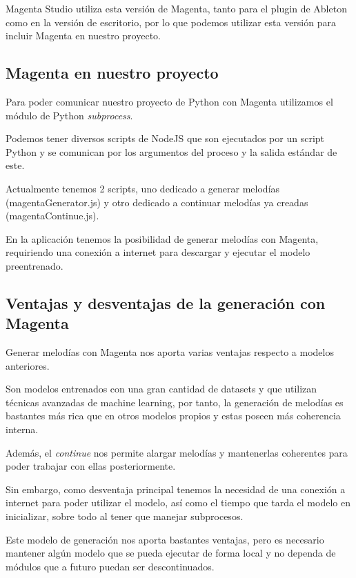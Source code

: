     Magenta Studio utiliza esta versión de Magenta, tanto para el plugin de Ableton como en la versión de escritorio, por lo que podemos utilizar esta versión para incluir Magenta en nuestro proyecto.

    \subsection{Magenta en nuestro proyecto}
    \label{subsec:magentaEnNuestroProyecto}
    Para poder comunicar nuestro proyecto de Python con Magenta utilizamos el módulo de Python \textit{subprocess}.

    Podemos tener diversos scripts de NodeJS que son ejecutados por un script Python y se comunican por los argumentos del proceso y la salida estándar de este. 

    Actualmente tenemos 2 scripts, uno dedicado a generar melodías (magentaGenerator.js) y otro dedicado a continuar melodías ya creadas (magentaContinue.js).

    En la aplicación tenemos la posibilidad de generar melodías con Magenta, requiriendo una conexión a internet para descargar y ejecutar el modelo preentrenado.

    \subsection{Ventajas y desventajas de la generación con Magenta}
    \label{ventajasYDesventajasMagenta}
    Generar melodías con Magenta nos aporta varias ventajas respecto a modelos anteriores.

    Son modelos entrenados con una gran cantidad de datasets y que utilizan técnicas avanzadas de machine learning, por tanto, la generación de melodías es bastantes más rica que en otros modelos propios y estas poseen más coherencia interna.

    Además, el \textit{continue} nos permite alargar melodías y mantenerlas coherentes para poder trabajar con ellas posteriormente.

    Sin embargo, como desventaja principal tenemos la necesidad de una conexión a internet para poder utilizar el modelo, así como el tiempo que tarda el modelo en inicializar, sobre todo al tener que manejar subprocesos.

    Este modelo de generación nos aporta bastantes ventajas, pero es necesario mantener algún modelo que se pueda ejecutar de forma local y no dependa de módulos que a futuro puedan ser descontinuados.